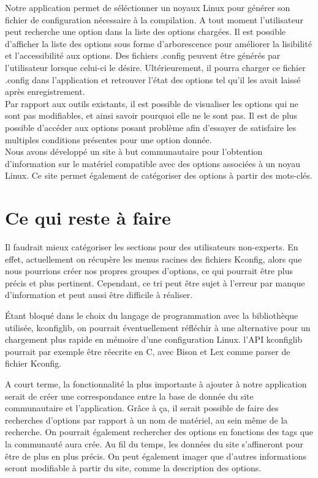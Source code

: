 \documentclass[16pts]{report}
\begin{document}
    Notre application permet de séléctionner un noyaux Linux pour générer son
    fichier de configuration nécessaire à la compilation. A tout moment 
    l'utilisateur peut recherche une option dans la liste des options chargées.
    Il est possible d'afficher la liste des options sous forme d'arborescence 
    pour améliorer la lisibilité et l'accessibilité aux options. Des fichiers
    .config peuvent être générés par l'utilisateur lorsque celui-ci le désire.
    Ultérieurement, il pourra charger ce fichier .config dans l'application et
    retrouver l'état des options tel qu'il les avait laissé après
    enregistrement.\\
    
    Par rapport aux outils existants, il est possible de visualiser les options
    qui ne sont pas modifiables, et ainsi savoir pourquoi elle ne le sont pas.
    Il est de plus possible d'accéder aux options posant problème afin d'essayer
    de satisfaire les multiples conditions présentes pour une option donnée.\\

    Nous avons développé un site à but communautaire pour l'obtention d'information
    sur le matériel compatible avec des options associées à un noyau Linux. Ce site
    permet également de catégoriser des options à partir des mots-clés.\\

    \section{Ce qui reste à faire}
    \label{sec:Ce qui reste à faire}
    Il faudrait mieux catégoriser les sections pour des utilisateurs non-experts.
    En effet, actuellement on récupère les menus racines des fichiers Kconfig,
    alors que nous pourrions créer nos propres groupes d'options, ce qui pourrait
    être plus précis et plus pertinent. Cependant, ce tri peut être sujet à l'erreur
    par manque d'information et peut aussi être difficile à réaliser.


    Étant bloqué dans le choix du langage de programmation avec la bibliothèque
    utilisée, kconfiglib, on pourrait éventuellement réfléchir à une alternative
    pour un chargement plus rapide en mémoire d'une configuration Linux.
    l'API kconfiglib pourrait par exemple être réecrite en C, avec Bison et Lex comme
    parser de fichier Kconfig. 

    A court terme, la fonctionnalité la plus importante à ajouter
    à notre application serait de créer une correspondance entre la base de donnée du
    site communautaire et l'application. Grâce à ça, il serait possible de faire des
    recherches d'options par rapport à un nom de matériel, au sein même de la
    recherche. On pourrait également rechercher des options en fonctions des
    tags que la communauté aura crée. Au fil du temps, les données du site
    s'affineront pour être de plus en plus précis. On peut également
    imager que d'autres informations seront modifiable à partir du site,
    comme la description des options.
\end{document}
